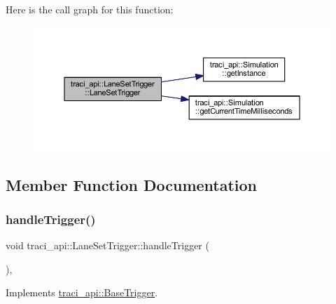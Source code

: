 Here is the call graph for this function\+:\nopagebreak
\begin{figure}[H]
\begin{center}
\leavevmode
\includegraphics[width=350pt]{classtraci__api_1_1_lane_set_trigger_a2af85a3a539f5a6c0624085c90cd6fa8_cgraph}
\end{center}
\end{figure}


\subsection{Member Function Documentation}
\mbox{\label{classtraci__api_1_1_lane_set_trigger_a9bc702339daf8aa0d905e3bab5ff2dc3}} 
\subsubsection{\texorpdfstring{handle\+Trigger()}{handleTrigger()}}
{\footnotesize\ttfamily void traci\+\_\+api\+::\+Lane\+Set\+Trigger\+::handle\+Trigger (\begin{DoxyParamCaption}{ }\end{DoxyParamCaption})\hspace{0.3cm}{\ttfamily [override]}, {\ttfamily [virtual]}}



Implements \hyperlink{classtraci__api_1_1_base_trigger_a2de2824fb1d228d4c04aa15c272017a5}{traci\+\_\+api\+::\+Base\+Trigger}.

\mbox{\label{classtraci__api_1_1_lane_set_trigger_ae606560cb760e12b0f1a86407f614e18}} 
